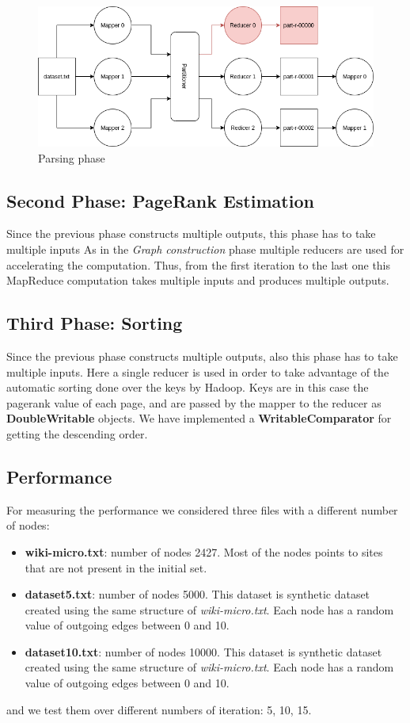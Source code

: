 \begin{figure}[H]
	\includegraphics[width=\textwidth]{img/ParserSchema.png}
	\caption{Parsing phase}
	\label{fig:parsingPhase}     
\end{figure}

\subsection{Second Phase: PageRank Estimation}
Since the previous phase constructs multiple outputs, this phase has to take multiple inputs
As in the \textit{Graph construction} phase multiple reducers are used for accelerating the computation. Thus, from the first iteration to the last one this MapReduce computation takes multiple inputs and produces multiple outputs.

\subsection{Third Phase: Sorting}
Since the previous phase constructs multiple outputs, also this phase has to take multiple inputs. Here a single reducer is used in order to take advantage of the automatic sorting done over the keys by Hadoop. Keys are in this case the pagerank value of each page, and are passed by the mapper to the reducer as \textbf{DoubleWritable} objects. We have implemented a \textbf{WritableComparator} for getting the descending order.

\subsection{Performance}
For measuring the performance we considered three files with a different number of nodes:
\begin{itemize}
	\item \textbf{wiki-micro.txt}: number of nodes 2427. Most of the nodes points to sites that are not present in the initial set.
	\item \textbf{dataset5.txt}: number of nodes 5000. This dataset is synthetic dataset created using the same structure of \textit{wiki-micro.txt}. Each node has a random value of outgoing edges between 0 and 10.
	\item \textbf{dataset10.txt}: number of nodes 10000. This dataset is synthetic dataset created using the same structure of \textit{wiki-micro.txt}. Each node has a random value of outgoing edges between 0 and 10.
\end{itemize}
and we test them over different numbers of iteration: 5, 10, 15.


